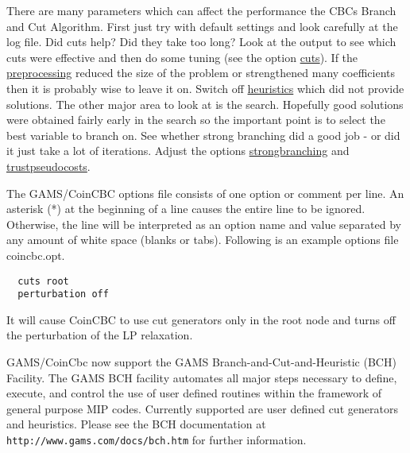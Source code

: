 There are many parameters which can affect the performance the CBCs Branch and Cut Algorithm.
First just try with default settings and look carefully at the log file.
Did cuts help? Did they take too long? Look at the output to see which cuts were effective and then do some tuning (see the option \hyperlink{cuts}{cuts}).
If the \hyperlink{preprocess}{preprocessing} reduced the size of the problem or strengthened many coefficients then it is probably wise to leave it on.
Switch off \hyperlink{heuristics}{heuristics} which did not provide solutions.
The other major area to look at is the search. Hopefully good solutions were obtained fairly early in the search so the important point is to select the best variable to branch on.
See whether strong branching did a good job - or did it just take a lot of iterations.
Adjust the options \hyperlink{strongbranching}{strongbranching} and \hyperlink{trustpseudocosts}{trustpseudocosts}.

The GAMS/CoinCBC options file consists of one option or comment per line.
An asterisk (*) at the beginning of a line causes the entire line to be ignored.
Otherwise, the line will be interpreted as an option name and value separated by any amount of white space (blanks or tabs).
Following is an example options file coincbc.opt.
\begin{verbatim}
  cuts root
  perturbation off
\end{verbatim}
It will cause CoinCBC to use cut generators only in the root node and turns off the perturbation of the LP relaxation.

GAMS/CoinCbc now support the GAMS Branch-and-Cut-and-Heuristic (BCH) Facility.
The GAMS BCH facility automates all major steps necessary to define, execute, and control the use of user defined routines within the framework of general purpose MIP codes.
Currently supported are user defined cut generators and heuristics.
Please see the BCH documentation at \texttt{http://www.gams.com/docs/bch.htm} for further information.







